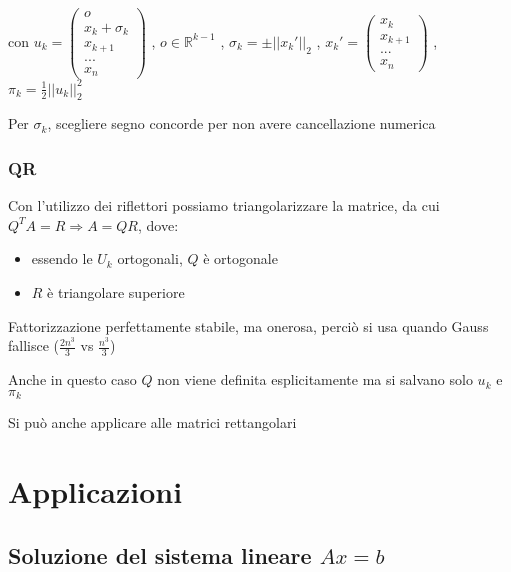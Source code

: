 \documentclass[openany]{book}
\begin{document}
\\

con \quad $u_k=\left( \begin{array}{c} o \\ x_k + \sigma_k \\ x_{k+1} \\ ... \\ x_n \end{array} \right)$ \quad , \quad 
 $o\in \mathbb{R}^{k-1}$ \quad , \quad
$\sigma_k = \pm ||x_k'||_2$ \quad , \quad 
$x_k'= \left( \begin{array}{c} x_k \\ x_{k+1} \\ ... \\ x_n \end{array} \right)$ \quad , \quad 
$\pi_k=\frac{1}{2}||u_k||_2^2$ 

Per $\sigma_k$, scegliere segno concorde per non avere cancellazione numerica

\subsubsection{QR}


Con l'utilizzo dei riflettori possiamo triangolarizzare la matrice, da cui $Q^TA=R \Rightarrow A=QR$, dove:

\begin{itemize}
	\item essendo le $U_k$ ortogonali, $Q$ è ortogonale
	\item $R$ è triangolare superiore
\end{itemize}

Fattorizzazione perfettamente stabile, ma onerosa, perciò si usa quando Gauss fallisce ($\frac{2n^3}{3}$ vs $\frac{n^3}{3}$)

Anche in questo caso $Q$ non viene definita esplicitamente ma si salvano solo $u_k$ e $\pi_k$

Si può anche applicare alle matrici rettangolari

\newpage

\section{Applicazioni}
\subsection{Soluzione del sistema lineare $Ax=b$}
\end{document}
